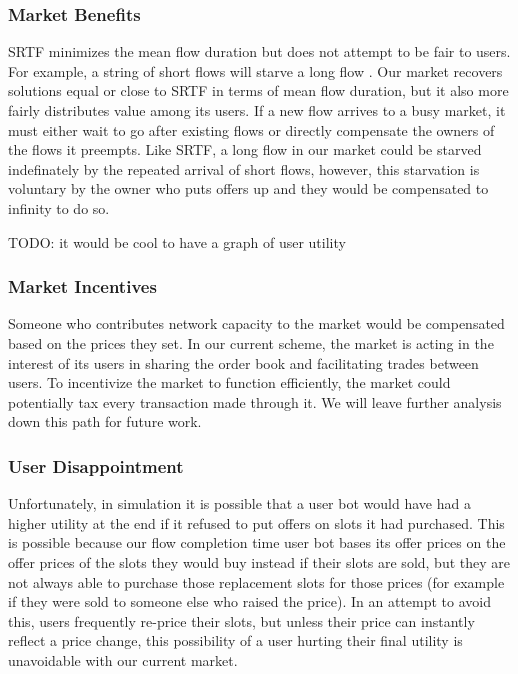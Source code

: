 \subsubsection{Market Benefits}
SRTF minimizes the mean flow duration but does not attempt to be fair to users. For example, a string of short flows will starve a long flow \cite{bender98}.
Our market recovers solutions equal or close to SRTF in terms of mean flow duration, but it also more fairly distributes value among its users.
If a new flow arrives to a busy market, it must either wait to go after existing flows or directly compensate the owners of the flows it preempts. Like SRTF, a long flow in our market could be starved indefinately by the repeated arrival of short flows, however, this starvation is voluntary by the owner who puts offers up and they would be compensated to infinity to do so.

TODO: it would be cool to have a graph of user utility
\subsubsection{Market Incentives}
Someone who contributes network capacity to the market would be compensated based on the prices they set.
In our current scheme, the market is acting in the interest of its users in sharing the order book and facilitating trades between users.
To incentivize the market to function efficiently, the market could potentially tax every transaction made through it. We will leave further analysis down this path for future work.

\subsubsection{User Disappointment}
Unfortunately, in simulation it is possible that a user bot would have had a higher utility at the end if it refused to put offers on slots it had purchased.
This is possible because our flow completion time user bot bases its offer prices on the offer prices of the slots they would buy instead if their slots are sold, but they are not always able to purchase those replacement slots for those prices (for example if they were sold to someone else who raised the price).
In an attempt to avoid this, users frequently re-price their slots, but unless their price can instantly reflect a price change, this possibility of a user hurting their final utility is unavoidable with our current market.

